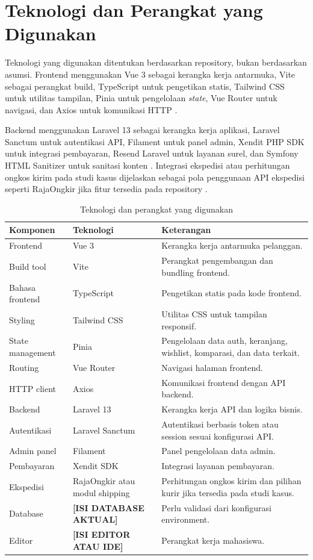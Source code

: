\documentclass[12pt,a4paper,oneside]{report}
\newcommand{\placeholder}[1]{\textbf{[#1]}}
\begin{document}
\section{Teknologi dan Perangkat yang Digunakan}

Teknologi yang digunakan ditentukan berdasarkan repository, bukan berdasarkan asumsi. Frontend menggunakan Vue 3 sebagai kerangka kerja antarmuka, Vite sebagai perangkat build, TypeScript untuk pengetikan statis, Tailwind CSS untuk utilitas tampilan, Pinia untuk pengelolaan \textit{state}, Vue Router untuk navigasi, dan Axios untuk komunikasi HTTP \cite{vue2026docs,vite2026docs,tailwind2026docs,pinia2026docs}.

Backend menggunakan Laravel 13 sebagai kerangka kerja aplikasi, Laravel Sanctum untuk autentikasi API, Filament untuk panel admin, Xendit PHP SDK untuk integrasi pembayaran, Resend Laravel untuk layanan surel, dan Symfony HTML Sanitizer untuk sanitasi konten \cite{laravel2026docs,filament2026docs,xendit2026docs}. Integrasi ekspedisi atau perhitungan ongkos kirim pada studi kasus dijelaskan sebagai pola penggunaan API ekspedisi seperti RajaOngkir jika fitur tersedia pada repository \cite{rajaongkir2026docs}.

\begin{longtable}{p{}p{}p{}}
\caption{Teknologi dan perangkat yang digunakan}\\
\toprule
Komponen & Teknologi & Keterangan\\
\midrule
Frontend & Vue 3 & Kerangka kerja antarmuka pelanggan.\\
Build tool & Vite & Perangkat pengembangan dan bundling frontend.\\
Bahasa frontend & TypeScript & Pengetikan statis pada kode frontend.\\
Styling & Tailwind CSS & Utilitas CSS untuk tampilan responsif.\\
State management & Pinia & Pengelolaan data auth, keranjang, wishlist, komparasi, dan data terkait.\\
Routing & Vue Router & Navigasi halaman frontend.\\
HTTP client & Axios & Komunikasi frontend dengan API backend.\\
Backend & Laravel 13 & Kerangka kerja API dan logika bisnis.\\
Autentikasi & Laravel Sanctum & Autentikasi berbasis token atau session sesuai konfigurasi API.\\
Admin panel & Filament & Panel pengelolaan data admin.\\
Pembayaran & Xendit SDK & Integrasi layanan pembayaran.\\
Ekspedisi & RajaOngkir atau modul shipping & Perhitungan ongkos kirim dan pilihan kurir jika tersedia pada studi kasus.\\
Database & \placeholder{ISI DATABASE AKTUAL} & Perlu validasi dari konfigurasi environment.\\
Editor & \placeholder{ISI EDITOR ATAU IDE} & Perangkat kerja mahasiswa.\\
\bottomrule
\end{longtable}
\end{document}
